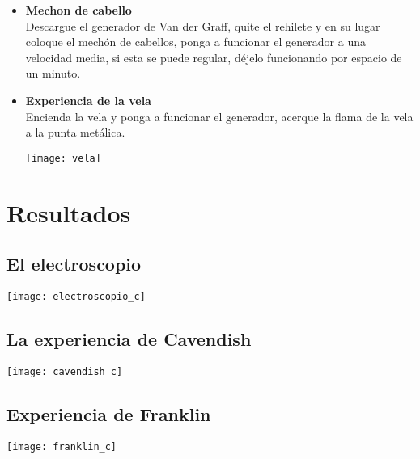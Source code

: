 \documentclass[11pt]{article}
\newenvironment{Figuras}
  {\par\medskip\noindent\minipage{\linewidth}}
  {\endminipage\par\medskip}
\begin{document}
\begin{multicols}{2}
\begin{itemize}
		\item\textbf{Mechon de cabello}\\
			Descargue el generador de Van der Graff, quite el rehilete y en su lugar coloque el mechón de cabellos, ponga a funcionar el generador a una velocidad media, si esta se puede regular, déjelo funcionando por espacio de un minuto.

		\item\textbf{Experiencia de la vela}\\
			Encienda la vela y ponga a funcionar el generador, acerque la flama de la vela a la punta metálica. 

		\begin{Figuras}
			\centering
  			  \texttt{[image: vela]}
			    \label{fig:mesh7}
		\end{Figuras}

		\end{itemize}

\section{Resultados}

	\subsection{El electroscopio}

\begin{Figuras}
	\centering
    \texttt{[image: electroscopio\_c]}
    \label{fig:mesh8}
\end{Figuras}

	\subsection{La experiencia de Cavendish}

\begin{Figuras}
	\centering
    \texttt{[image: cavendish\_c]}
    \label{fig:mesh9}
\end{Figuras}
	\subsection{Experiencia de Franklin}
\begin{Figuras}
	\centering
    \texttt{[image: franklin\_c]}
    \label{fig:mesh10}
\end{Figuras}


\end{multicols}
\end{document}
